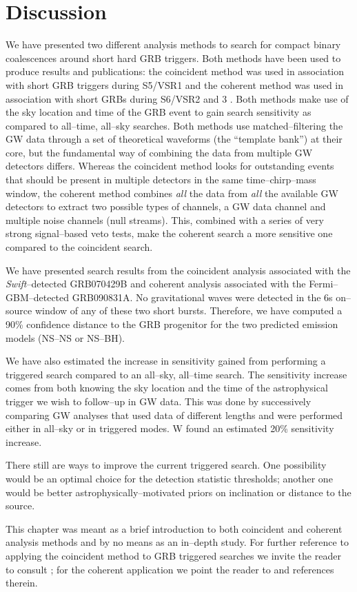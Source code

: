 \section{Discussion}

We have presented two different analysis methods to search for compact binary coalescences around short hard GRB triggers. Both methods have been used to produce results and publications: the coincident method was used in association with short GRB triggers during S5/VSR1 \cite{Abadie:2010uf} and the coherent method was used in association with short GRBs during S6/VSR2 and 3 \cite{lvc:s6grb}. Both methods make use of the sky location and time of the GRB event to gain search sensitivity as compared to all--time, all--sky searches. Both methods use matched--filtering the GW data through a set of theoretical waveforms (the ``template bank'') at their core, but the fundamental way of combining the data from multiple GW detectors differs. Whereas the coincident method looks for outstanding events that should be present in multiple detectors in the same time--chirp--mass window, the coherent method combines \emph{all} the data from \emph{all} the available GW detectors to extract two possible types of channels, a GW data channel and multiple noise channels (null streams). This, combined with a series of very strong signal--based veto tests, make the coherent search a more sensitive one compared to the coincident search.

We have presented search results from the coincident analysis associated with the \emph{Swift}--detected GRB070429B and coherent analysis associated with the Fermi--GBM--detected GRB090831A. No gravitational waves were detected in the 6s on--source window of any of these two short bursts. Therefore, we have computed a 90\% confidence distance to the GRB progenitor for the two predicted emission models (NS--NS or NS--BH).

We have also estimated the increase in sensitivity gained from performing a triggered search compared to an all--sky, all--time search. The sensitivity increase comes from both knowing the sky location and the time of the astrophysical trigger we wish to follow--up in GW data. This was done by successively comparing GW analyses that used data of different lengths and were performed either in all--sky or in triggered modes. W found an estimated 20\% sensitivity increase.

There still are ways to improve the current triggered search. One possibility would be an optimal choice for the detection statistic thresholds; another one would be better astrophysically--motivated priors on inclination or distance to the source.

This chapter was meant as a brief introduction to both coincident and coherent analysis methods and by no means as an in--depth study. For further reference to applying the coincident method to GRB triggered searches we invite the reader to consult \cite{Abadie:2010uf}; for the coherent application we point the reader to \cite{Harry:2010fr} and references therein.
